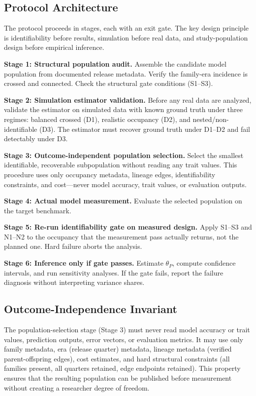 \documentclass{ieeeaccess}
\theoremstyle{definition}
\theoremstyle{plain}
\begin{document}
\subsection{Protocol Architecture}
The protocol proceeds in stages, each with an exit gate. The key design principle is identifiability before results, simulation before real data, and study-population design before empirical inference.

\textbf{Stage 1: Structural population audit.} Assemble the candidate model population from documented release metadata. Verify the family-era incidence is crossed and connected. Check the structural gate conditions (S1--S3).

\textbf{Stage 2: Simulation estimator validation.} Before any real data are analyzed, validate the estimator on simulated data with known ground truth under three regimes: balanced crossed (D1), realistic occupancy (D2), and nested/non-identifiable (D3). The estimator must recover ground truth under D1--D2 and fail detectably under D3.

\textbf{Stage 3: Outcome-independent population selection.} Select the smallest identifiable, recoverable subpopulation without reading any trait values. This procedure uses only occupancy metadata, lineage edges, identifiability constraints, and cost---never model accuracy, trait values, or evaluation outputs.

\textbf{Stage 4: Actual model measurement.} Evaluate the selected population on the target benchmark.

\textbf{Stage 5: Re-run identifiability gate on measured design.} Apply S1--S3 and N1--N2 to the occupancy that the measurement pass actually returns, not the planned one. Hard failure aborts the analysis.

\textbf{Stage 6: Inference only if gate passes.} Estimate $\theta_P$, compute confidence intervals, and run sensitivity analyses. If the gate fails, report the failure diagnosis without interpreting variance shares.

\subsection{Outcome-Independence Invariant}
The population-selection stage (Stage 3) must never read model accuracy or trait values, prediction outputs, error vectors, or evaluation metrics. It may use only family metadata, era (release quarter) metadata, lineage metadata (verified parent-offspring edges), cost estimates, and hard structural constraints (all families present, all quarters retained, edge endpoints retained). This property ensures that the resulting population can be published before measurement without creating a researcher degree of freedom.
\end{document}
